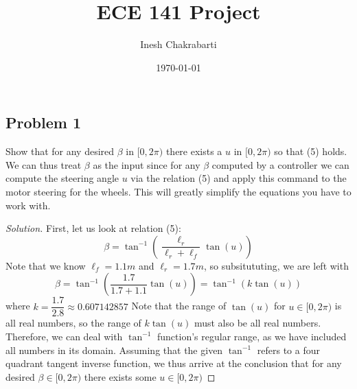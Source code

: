 \documentclass{article}
\title{ECE 141 Project} %
\author{Inesh Chakrabarti} %
\date{\today}
\newcommand{\atan}{\tan^{-1}}
\begin{document}
\maketitle

\subsection*{Problem 1}
Show that for any desired $\beta$ in $[0, 2\pi)$ there exists a $u$ in $[0, 2\pi)$ so that (5) holds. We can thus treat $\beta$ as the input since for any $\beta$ computed by a controller we can compute the steering angle $u$ via the relation (5) and apply this command to the motor steering for the wheels. This will greatly simplify the equations you have to work with.
\begin{proof}[Solution]
First, let us look at relation (5):
\[\beta = \atan\left(\dfrac{\ell_r}{\ell_r+\ell_f}\tan(u)\right)
\]
Note that we know $\ell_f = 1.1m$ and $\ell_r = 1.7m$, so subsitututing, we are left with 
\[\beta = \atan\left(\dfrac{1.7}{1.7+1.1}\tan(u)\right)= \atan(k\tan(u))
\]
where $k=\dfrac{1.7}{2.8} \approx 0.607142857$ \newline
Note that the range of $\tan(u)$ for $u \in [0, 2\pi)$ is all real numbers, so the range of $k\tan(u)$ must also be all real numbers. Therefore, we can deal with $\atan$ function's regular range, as we have included all numbers in its domain. Assuming that the given $\atan$ refers to a four quadrant tangent inverse function, we thus arrive at the conclusion that for any desired $\beta \in [0, 2\pi)$ there exists some $u \in [0, 2\pi)$
\end{proof}
\end{document}
